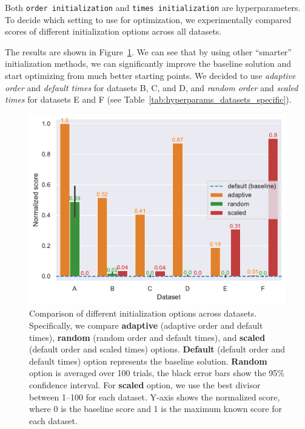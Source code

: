 Both \texttt{order initialization} and \texttt{times initialization} are hyperparameters. To decide which setting to use for optimization, we experimentally compared scores of different initialization options across all datasets.

The results are shown in Figure~\ref{fig:init_comparison}. We can see that by using other ``smarter'' initialization methods, we can significantly improve the baseline solution and start optimizing from much better starting points.
We decided to use \textit{adaptive order} and \textit{default times} for datasets B, C, and D, and \textit{random order} and \textit{scaled times} for datasets E and F (see Table~\ref{tab:hyperparams_datasets_specific}).

\begin{figure}[h]
    \centering
    \includegraphics[width=\linewidth]{img/experiments/init_experiment.pdf}
    \caption[Comparison of initialization options]{
        Comparison of different initialization options across datasets.
        Specifically, we compare \textcolor{myorange}{\textbf{adaptive}} (adaptive order and default times), \textcolor{mygreen}{\textbf{random}} (random order and default times), and \textcolor{myred}{\textbf{scaled}} (default order and scaled times) options. \textcolor{myblue}{\textbf{Default}} (default order and default times) option represents the baseline solution.
        \textcolor{mygreen}{\textbf{Random}} option is averaged over 100 trials, the black error bars show the 95\% confidence interval.
        For \textcolor{myred}{\textbf{scaled}} option, we use the best divisor between 1--100 for each dataset.
        Y-axis shows the normalized score, where 0 is the baseline score and 1 is the maximum known score for each dataset.
    }
    \label{fig:init_comparison}
\end{figure}

